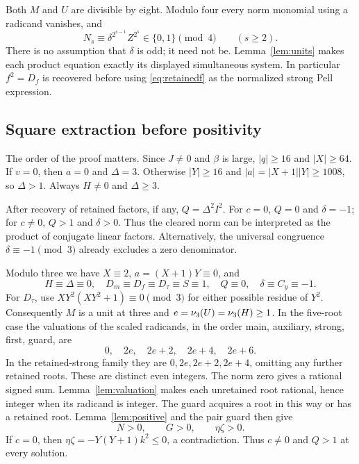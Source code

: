 Both $M$ and $U$ are divisible by eight. Modulo four every norm monomial
using a radicand vanishes, and
\begin{equation}
 N_s\equiv\delta^{2^{s-1}}Z^{2^s}\in\{0,1\}\pmod4\qquad(s\ge2).
 \label{eq:normmod4}
\end{equation}
There is no assumption that $\delta$ is odd; it need not be.
Lemma~\ref{lem:units} makes each product equation exactly its displayed
simultaneous system. In particular $f^2=D_f$ is recovered before using
\eqref{eq:retainedf} as the normalized strong Pell expression.

\subsection{Square extraction before positivity}
The order of the proof matters. Since $J\ne0$ and $\beta$ is large,
$|q|\ge16$ and $|X|\ge64$. If $v=0$, then $a=0$ and $\Delta=3$.
Otherwise $|Y|\ge16$ and $|a|=|X+1||Y|\ge1008$, so $\Delta>1$.
Always $H\ne0$ and $\Delta\ge3$.

After recovery of retained factors, if any, $Q=\Delta^2I^2$.
For $c=0$, $Q=0$ and $\delta=-1$; for $c\ne0$, $Q>1$ and
$\delta>0$. Thus the cleared norm can be interpreted as the product of
conjugate linear factors. Alternatively, the universal congruence
$\delta\equiv-1\pmod3$ already excludes a zero denominator.

Modulo three we have $X\equiv2$, $a=(X+1)Y\equiv0$, and
\[
 H\equiv\Delta\equiv0,\quad
 D_m\equiv D_f\equiv D_\tau\equiv S\equiv1,\quad
 Q\equiv0,\quad\delta\equiv C_y\equiv-1.
\]
For $D_\tau$, use $XY^2(XY^2+1)\equiv0\pmod3$ for either possible
residue of $Y^2$. Consequently $M$ is a unit at three and
$e=\nu_3(U)=\nu_3(H)\ge1$. In the five-root case the valuations of the
scaled radicands, in the order main, auxiliary, strong, first, guard, are
\[
 0,\quad2e,\quad2e+2,\quad2e+4,\quad2e+6.
\]
In the retained-strong family they are $0,2e,2e+2,2e+4$, omitting
any further retained roots. These are distinct even integers.
The norm zero gives a rational signed sum. Lemma~\ref{lem:valuation}
makes each unretained root rational, hence integer when its radicand is
integer. The guard acquires a root in this way or has a retained root.
Lemma~\ref{lem:positive} and the pair guard then give
\begin{equation}
 N>0,\qquad G>0,\qquad\eta\zeta>0.\label{eq:recoveredguard}
\end{equation}
If $c=0$, then $\eta\zeta=-Y(Y+1)k^2\le0$, a contradiction.
Thus $c\ne0$ and $Q>1$ at every solution.

